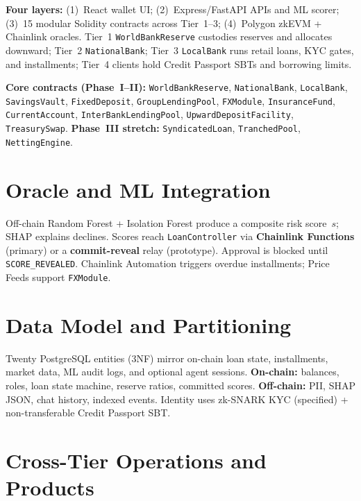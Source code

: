 \documentclass[12pt, a4paper]{report}
\begin{document}
\textbf{Four layers:} (1)~React wallet UI; (2)~Express/FastAPI APIs and ML scorer; (3)~15 modular Solidity contracts across Tier~1--3; (4)~Polygon zkEVM + Chainlink oracles. Tier~1 \texttt{WorldBankReserve} custodies reserves and allocates downward; Tier~2 \texttt{NationalBank}; Tier~3 \texttt{LocalBank} runs retail loans, KYC gates, and installments; Tier~4 clients hold Credit Passport SBTs and borrowing limits.

\textbf{Core contracts (Phase~I--II):} \texttt{WorldBankReserve}, \texttt{NationalBank}, \texttt{LocalBank}, \texttt{SavingsVault}, \texttt{FixedDeposit}, \texttt{GroupLendingPool}, \texttt{FXModule}, \texttt{InsuranceFund}, \texttt{CurrentAccount}, \texttt{InterBankLendingPool}, \texttt{UpwardDepositFacility}, \texttt{TreasurySwap}. \textbf{Phase~III stretch:} \texttt{SyndicatedLoan}, \texttt{TranchedPool}, \texttt{NettingEngine}.

\section{Oracle and ML Integration}
\label{sec:oracle-architecture}
\label{sec:ml-explainability}
\label{sec:aiml-support}

Off-chain Random Forest + Isolation Forest produce a composite risk score~$s$; SHAP explains declines. Scores reach \texttt{LoanController} via \textbf{Chainlink Functions} (primary) or a \textbf{commit-reveal} relay (prototype). Approval is blocked until \texttt{SCORE\_REVEALED}. Chainlink Automation triggers overdue installments; Price Feeds support \texttt{FXModule}.

\section{Data Model and Partitioning}
\label{sec:data-model-compressed}

Twenty PostgreSQL entities (3NF) mirror on-chain loan state, installments, market data, ML audit logs, and optional agent sessions. \textbf{On-chain:} balances, roles, loan state machine, reserve ratios, committed scores. \textbf{Off-chain:} PII, SHAP JSON, chat history, indexed events. Identity uses zk-SNARK KYC (specified) + non-transferable Credit Passport SBT.

\section{Cross-Tier Operations and Products}
\label{sec:multi-entity}
\label{sec:over-indebt}
\label{sec:interbank-pool}
\label{sec:bridge}
\label{sec:kinked-rate}
\label{sec:upward-flow}
\label{sec:credit-passport}
\label{sec:identity}
\end{document}
